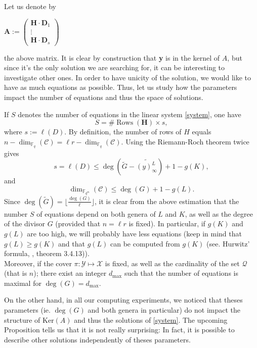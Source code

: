 \documentclass[10pt]{article}
\theoremstyle{definition}
\theoremstyle{definition}
\theoremstyle{definition}
\newcommand{\s}{\vspace{0.3cm}}
\newcommand{\cd}{\cdot}
\newcommand{\fqm}{\mathbb{F}_{q^m}}
\newcommand{\fq}{\mathbb{F}_q}
\newcommand{\X}{\mathcal{X}}
\newcommand{\Y}{\mathcal{Y}}
\newcommand{\QR}{\mathcal{Q}}
\begin{document}
\s

 Let us denote by
\begin{center}
$\mathbf{A} := \begin{pmatrix}
\mathbf{H} \cd \mathbf{D}_1 \\
\vdots \\
\mathbf{H} \cd \mathbf{D}_s
\end{pmatrix}
$
\end{center}
the above matrix. It is clear by construction that \textbf{y} is in the kernel of $A$, but since it's the only solution we are searching for, it can be interesting to investigate other ones. In order to have unicity of the solution, we would like to have as much equations as possible. Thus, let us study how the parameters impact the number of equations and thus the space of solutions.

\s 

If $S$ denotes the number of equations in the linear system \eqref{system}, one have 
\[S = \#\operatorname{Rows}(\mathbf{H}) \times s,\]
where $s := \ell( D)$. By definition, the number of rows of $H$ equals $n-\dim_{\fq}(\mathcal{C})= \ell r - \dim_{\fq}(\mathcal{C})$.
Using the Riemann-Roch theorem  twice gives 
\[s = \ell(D) \leq \deg\left( \tilde{G}-\widetilde{(y)^L_{\infty}}\right) +1 -  g(K) ,\]
and
\[\dim_{\fqm}(\mathcal{C}) \leq \deg(G)+1-g(L).\]
Since $\deg(\tilde{G}) = \lfloor \frac{\deg(G)}{\ell} \rfloor$, it is clear from the above estimation that the number $S$ of equations depend on both genera of $L$ and $K$, as well as the degree of the divisor $G$ (provided that $n=\ell r$ is fixed). In particular, if $g(K)$ and $g(L)$ are too high, we will probably have less equations (keep in mind that $g(L) \geq g(K)$ and that $g(L)$ can be computed from $g(K)$ (see. Hurwitz' formula, \cite{Sti}, theorem 3.4.13)). \\
Moreover, if the cover $\pi : \Y \longmapsto \X$ is fixed, as well as the cardinality of the set $\QR$ (that is $n$); there exist an integer $d_{\max}$ such that the number of equations is maximal for $\deg(G)=  d_{\max}$. 

\s
\color{purple}
On the other hand, in all our computing experiments, we noticed that theses parameters (ie. $\deg(G)$ and both genera in particular) do not impact the structure of $\mathrm{Ker}(A)$ and thus the solutions of \eqref{system}. The upcoming Proposition tells us that it is not really surprising: In fact, it is possible to describe other solutions independently of theses parameters.
\color{black}
\s
\end{document}
